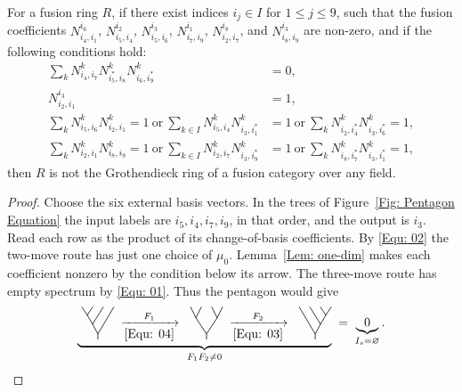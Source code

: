 \documentclass{amsart}
\begin{document}
\begin{theorem}\label{Thm: Ob-0}
For a fusion ring $R$, if there exist indices $i_j \in I$ for $1 \leq j \leq 9$, such that the fusion coefficients $N_{i_4,i_1}^{i_6}$, $N_{i_5,i_4}^{i_2}$, $N_{i_5,i_6}^{i_3}$, $N_{i_7,i_9}^{i_1}$, $N_{i_2,i_7}^{i_8}$, and $N_{i_8,i_9}^{i_3}$  are non-zero, and if the following conditions hold:
\begin{align} \label{Equ: 01}
\sum_{k} N_{i_4,i_7}^{k} N_{i_5^*,i_8}^{k} N_{i_6,i_9^*}^{k}&=0,\\  \label{Equ: 02}
N_{i_2,i_1}^{i_{3}}&=1, \\ \label{Equ: 03}
\sum_{k} N_{i_5,i_6}^{k} N_{i_2,i_1}^{k} =1 %
~\text{or}~
\sum_{k \in I} N_{i_5,i_4}^{k} N_{i_3,i_1^*}^{k} &=1 %
~\text{or}~
\sum_{k} N_{i_2,i_4^*}^{k} N_{i_3,i_6^*}^{k} =1, %
\\
\label{Equ: 04}
\sum_{k} N_{i_2,i_1}^{k} N_{i_8,i_9}^{k} =1 %
~\text{or}~
\sum_{k \in I} N_{i_2,i_7}^{k} N_{i_3,i_9^*}^{k} &=1 %
~\text{or}~
\sum_{k} N_{i_8,i_7^*}^{k} N_{i_3,i_1^*}^{k} =1, %
\end{align}
then $R$ is not the Grothendieck ring of a fusion category over any field.
\end{theorem}

\begin{proof}
Choose the six external basis vectors. In the trees of Figure~\ref{Fig: Pentagon Equation} the input labels are $i_5,i_4,i_7,i_9$, in that order, and the output is $i_3$. Read each row as the product of its change-of-basis coefficients. By \eqref{Equ: 02} the two-move route has just one choice of $\mu_0$. Lemma~\ref{Lem: one-dim} makes each coefficient nonzero by the condition below its arrow. The three-move route has empty spectrum by \eqref{Equ: 01}. Thus the pentagon would give
\[
 \underbrace{\spectrumtree{0}\;\xrightarrow[\eqref{Equ: 04}]{F_1}\;\spectrumtree{1}
 \;\xrightarrow[\eqref{Equ: 03}]{F_2}\;\spectrumtree{2}}_{F_1F_2\ne0}
 \;=\;\underbrace{0}_{\SpecS=\varnothing}.\qedhere
\]
\end{proof}
\end{document}
